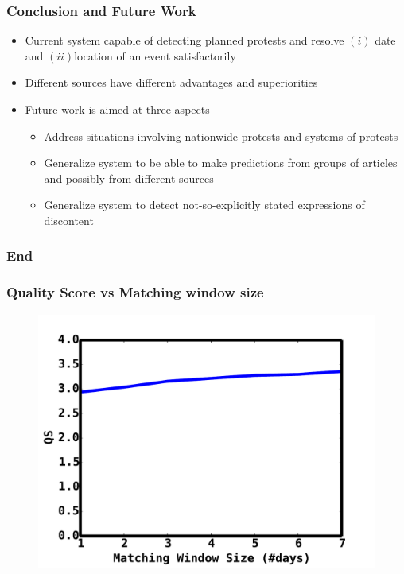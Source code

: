 \documentclass[red,handout]{beamer}
\begin{document}
\begin{frame}
    \frametitle{Conclusion and Future Work}
    \begin{itemize}[<+->]
        \item
            Current system capable of detecting planned protests and resolve $(i)$ date and $(ii)$location of an event satisfactorily
        \item
            Different sources have different advantages and superiorities
        \item
            Future work is aimed at three aspects
            \begin{itemize}[<+->]
                \item
                    Address situations involving nationwide protests and systems of protests
                \item
                    Generalize system to be able to make predictions from groups of articles and possibly from different sources
                \item
                    Generalize system to detect not-so-explicitly stated expressions of discontent
                \end{itemize}
        \end{itemize}
\end{frame}

\begin{frame}
    \frametitle{End}
\end{frame}


\begin{frame}[noframenumbering]
    \frametitle{Quality Score vs Matching window size}
    \begin{figure}
        \includegraphics[scale=0.4]{matchingwindow}
    \end{figure}
\end{frame}
\end{document}
